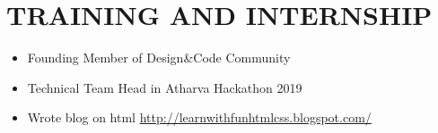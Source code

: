 \documentclass[paper=a4,fontsize=12pt]{scrartcl}
\newcommand{\NewPart}[1]{\section*{\uppercase{#1}}}
\begin{document}
\NewPart{Training and Internship}{}
\begin{itemize}
	\item Founding Member of Design\&Code Community
	\item Technical Team Head in Atharva Hackathon 2019
	\item Wrote blog on html \href{http://learnwithfunhtmlcss.blogspot.com/}{http://learnwithfunhtmlcss.blogspot.com/}	
\end{itemize}
\end{document}
